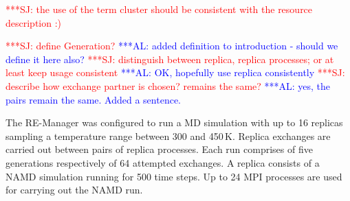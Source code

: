 \documentclass{rspublic}
\newcommand{\alnote}[1]{ {\textcolor{blue} { ***AL: #1 }}}
\newcommand{\jhanote}[1]{ {\textcolor{red} { ***SJ: #1 }}}
\newcommand{\alnote}[1]{}
\newcommand{\jhanote}[1]{}
\begin{document}
\jhanote{the use of the term cluster should be consistent with the
  resource description :)}




\jhanote{define Generation?}            
\alnote{added definition to introduction - should we define it here also?}
\jhanote{distinguish  between replica, replica processes; or at least
 keep usage consistent}       
\alnote{OK, hopefully use replica consistently}
\jhanote{describe how exchange partner is chosen? remains the same?}\alnote{yes, the
pairs remain the same. Added a sentence.}

The RE-Manager was configured to run a MD simulation with up to 16
replicas sampling a temperature range between 300 and
450\,K. Replica exchanges are carried out between pairs of replica
processes. Each run comprises of five generations respectively of 64
attempted exchanges.  A replica consists of a NAMD simulation
running for 500 time steps. Up to 24 MPI processes are used for
carrying out the NAMD run.
\end{document}

